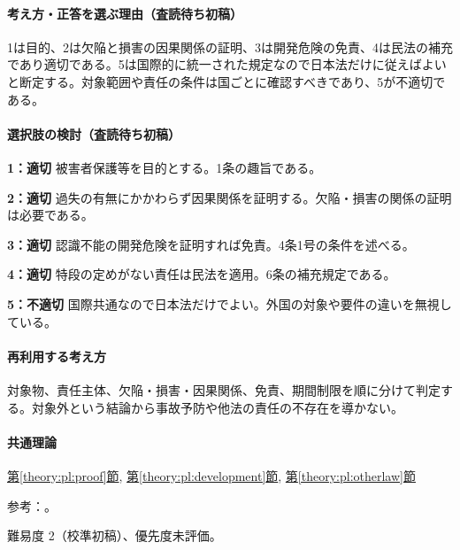 \paragraph{考え方・正答を選ぶ理由（査読待ち初稿）} 1は目的、2は欠陥と損害の因果関係の証明、3は開発危険の免責、4は民法の補充であり適切である。5は国際的に統一された規定なので日本法だけに従えばよいと断定する。対象範囲や責任の条件は国ごとに確認すべきであり、5が不適切である。

\paragraph{選択肢の検討（査読待ち初稿）}\mbox{}\par

\noindent\textbf{1：適切} 被害者保護等を目的とする。1条の趣旨である。\par

\noindent\textbf{2：適切} 過失の有無にかかわらず因果関係を証明する。欠陥・損害の関係の証明は必要である。\par

\noindent\textbf{3：適切} 認識不能の開発危険を証明すれば免責。4条1号の条件を述べる。\par

\noindent\textbf{4：適切} 特段の定めがない責任は民法を適用。6条の補充規定である。\par

\noindent\textbf{5：不適切} 国際共通なので日本法だけでよい。外国の対象や要件の違いを無視している。\par

\paragraph{再利用する考え方} 対象物、責任主体、欠陥・損害・因果関係、免責、期間制限を順に分けて判定する。対象外という結論から事故予防や他法の責任の不存在を導かない。

\paragraph{共通理論} \hyperref[theory:pl:proof]{第\ref*{theory:pl:proof}節}, \hyperref[theory:pl:development]{第\ref*{theory:pl:development}節}, \hyperref[theory:pl:otherlaw]{第\ref*{theory:pl:otherlaw}節}

\par 参考：\cite{pl_statute,pl_qa,pl_definitions2018}。

\par 難易度 2（校準初稿）、優先度未評価。

